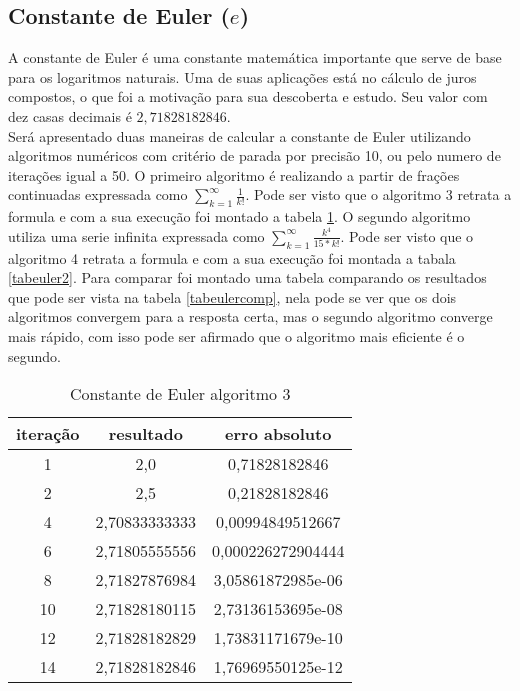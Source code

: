 \documentclass[12pt]{article}
\begin{document}
\subsection{Constante de Euler ($e$)}
A constante de Euler é uma constante matemática importante que serve de base para os logaritmos naturais. Uma de suas aplicações está no cálculo de juros compostos, o que foi a motivação para sua descoberta e estudo. Seu valor com dez casas decimais é $ 2,71828182846$. \\
Será apresentado duas maneiras de calcular a constante de Euler utilizando algoritmos numéricos com critério de parada por precisão 10, ou pelo numero de iterações igual a 50. O primeiro algoritmo é realizando a partir de frações continuadas expressada como $\sum\limits_{k=1}^{\infty} \frac{1}{k!}$\cite{Euler}. Pode ser visto que o algoritmo 3 retrata a formula e com a sua execução foi montado a tabela \ref{tabeuler1}. O segundo algoritmo utiliza uma serie infinita expressada como $\sum\limits_{k=1}^{\infty} \frac{k^4}{15 * k!}$\cite{EulerPort}. Pode ser visto que o algoritmo 4 retrata a formula e com a sua execução foi montada a tabala \ref{tabeuler2}. Para comparar foi montado uma tabela comparando os resultados que pode ser vista na tabela \ref{tabeulercomp}, nela pode se ver que os dois algoritmos convergem para a resposta certa, mas o segundo algoritmo converge mais rápido, com isso pode ser afirmado que o algoritmo mais eficiente é o segundo.


\begin{table}[ht]
\centering
\caption{Constante de Euler algoritmo 3}
\vspace{0.5cm}
\begin{tabular}{c|c|c}
\hline   
\hline   
iteração & resultado & erro absoluto \\
\hline   
1 & 2,0 & 0,71828182846 \\
2 & 2,5 & 0,21828182846 \\
4 & 2,70833333333 & 0,00994849512667 \\
6 & 2,71805555556 & 0,000226272904444 \\
8 & 2,71827876984 & 3,05861872985e-06 \\
10 & 2,71828180115 & 2,73136153695e-08 \\
12 & 2,71828182829 & 1,73831171679e-10 \\
14 & 2,71828182846 & 1,76969550125e-12 \\
\hline   
\hline   
\end{tabular}
\label{tabeuler1}
\end{table}
\end{document}

